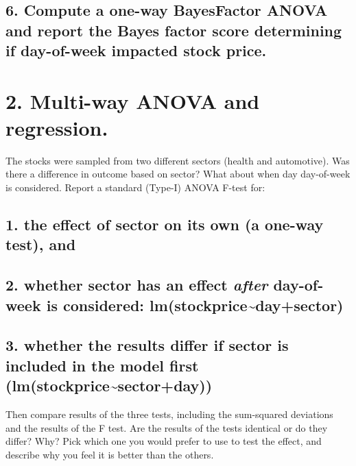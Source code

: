 \documentclass[]{article}
\begin{document}
\subsection{6. Compute a one-way BayesFactor ANOVA and report the Bayes
factor score determining if day-of-week impacted stock
price.}\label{compute-a-one-way-bayesfactor-anova-and-report-the-bayes-factor-score-determining-if-day-of-week-impacted-stock-price.}

\section{2. Multi-way ANOVA and
regression.}\label{multi-way-anova-and-regression.}

The stocks were sampled from two different sectors (health and
automotive). Was there a difference in outcome based on sector? What
about when day day-of-week is considered. Report a standard (Type-I)
ANOVA F-test for:

\subsection{1. the effect of sector on its own (a one-way test),
and}\label{the-effect-of-sector-on-its-own-a-one-way-test-and}

\subsection{\texorpdfstring{2. whether sector has an effect \emph{after}
day-of-week is considered:
lm(stockprice\textasciitilde{}day+sector)}{2. whether sector has an effect after day-of-week is considered: lm(stockprice\textasciitilde{}day+sector)}}\label{whether-sector-has-an-effect-after-day-of-week-is-considered-lmstockpricedaysector}

\subsection{3. whether the results differ if sector is included in the
model first
(lm(stockprice\textasciitilde{}sector+day))}\label{whether-the-results-differ-if-sector-is-included-in-the-model-first-lmstockpricesectorday}

Then compare results of the three tests, including the sum-squared
deviations and the results of the F test. Are the results of the tests
identical or do they differ? Why? Pick which one you would prefer to use
to test the effect, and describe why you feel it is better than the
others.
\end{document}
